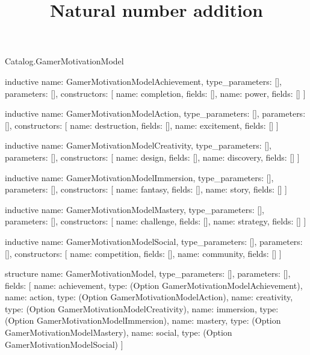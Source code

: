 \begin{lexlean}{Catalog.GamerMotivationModel}
\title{Natural number addition}
\begin{semanticmodule}
inductive{
  name: GamerMotivationModelAchievement,
  type_parameters: [],
  parameters: [],
  constructors: [
    {name: completion, fields: []},
    {name: power, fields: []}
  ]
}

inductive{
  name: GamerMotivationModelAction,
  type_parameters: [],
  parameters: [],
  constructors: [
    {name: destruction, fields: []},
    {name: excitement, fields: []}
  ]
}

inductive{
  name: GamerMotivationModelCreativity,
  type_parameters: [],
  parameters: [],
  constructors: [
    {name: design, fields: []},
    {name: discovery, fields: []}
  ]
}

inductive{
  name: GamerMotivationModelImmersion,
  type_parameters: [],
  parameters: [],
  constructors: [
    {name: fantasy, fields: []},
    {name: story, fields: []}
  ]
}

inductive{
  name: GamerMotivationModelMastery,
  type_parameters: [],
  parameters: [],
  constructors: [
    {name: challenge, fields: []},
    {name: strategy, fields: []}
  ]
}

inductive{
  name: GamerMotivationModelSocial,
  type_parameters: [],
  parameters: [],
  constructors: [
    {name: competition, fields: []},
    {name: community, fields: []}
  ]
}

structure{
  name: GamerMotivationModel,
  type_parameters: [],
  parameters: [],
  fields: [
    {name: achievement, type: (Option GamerMotivationModelAchievement)},
    {name: action, type: (Option GamerMotivationModelAction)},
    {name: creativity, type: (Option GamerMotivationModelCreativity)},
    {name: immersion, type: (Option GamerMotivationModelImmersion)},
    {name: mastery, type: (Option GamerMotivationModelMastery)},
    {name: social, type: (Option GamerMotivationModelSocial)}
  ]
}
\end{semanticmodule}
\end{lexlean}
